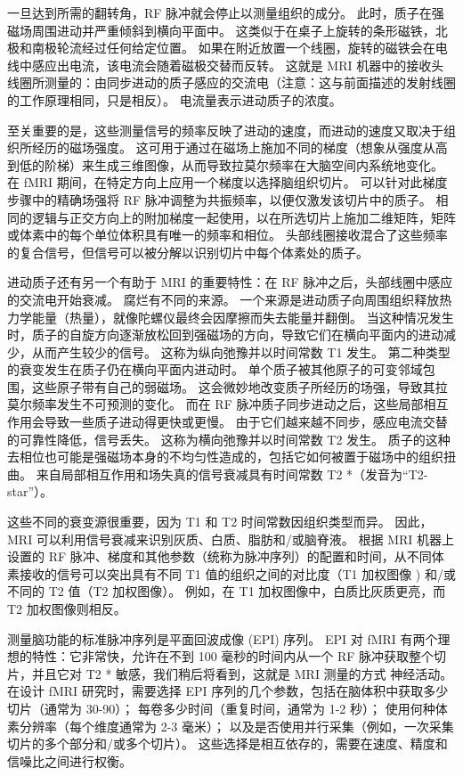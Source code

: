 一旦达到所需的翻转角，RF 脉冲就会停止以测量组织的成分。 
此时，质子在强磁场周围进动并严重倾斜到横向平面中。 
这类似于在桌子上旋转的条形磁铁，北极和南极轮流经过任何给定位置。 
如果在附近放置一个线圈，旋转的磁铁会在电线中感应出电流，该电流会随着磁极交替而反转。 
这就是 MRI 机器中的接收头线圈所测量的：由同步进动的质子感应的交流电（注意：这与前面描述的发射线圈的工作原理相同，只是相反）。 
电流量表示进动质子的浓度。


至关重要的是，这些测量信号的频率反映了进动的速度，而进动的速度又取决于组织所经历的磁场强度。 
这可用于通过在磁场上施加不同的梯度（想象从强度从高到低的阶梯）来生成三维图像，从而导致拉莫尔频率在大脑空间内系统地变化。 
在 fMRI 期间，在特定方向上应用一个梯度以选择脑组织切片。 
可以针对此梯度步骤中的精确场强将 RF 脉冲调整为共振频率，以便仅激发该切片中的质子。 
相同的逻辑与正交方向上的附加梯度一起使用，以在所选切片上施加二维矩阵，矩阵或体素中的每个单位体积具有唯一的频率和相位。 
头部线圈接收混合了这些频率的复合信号，但信号可以被分解以识别切片中每个体素处的质子。


进动质子还有另一个有助于 MRI 的重要特性：在 RF 脉冲之后，头部线圈中感应的交流电开始衰减。 
腐烂有不同的来源。 
一个来源是进动质子向周围组织释放热力学能量（热量），就像陀螺仪最终会因摩擦而失去能量并翻倒。 
当这种情况发生时，质子的自旋方向逐渐放松回到强磁场的方向，导致它们在横向平面内的进动减少，从而产生较少的信号。 
这称为纵向弛豫并以时间常数 T1 发生。 
第二种类型的衰变发生在质子仍在横向平面内进动时。 
单个质子被其他原子的可变邻域包围，这些原子带有自己的弱磁场。 
这会微妙地改变质子所经历的场强，导致其拉莫尔频率发生不可预测的变化。 
而在 RF 脉冲质子同步进动之后，这些局部相互作用会导致一些质子进动得更快或更慢。 
由于它们越来越不同步，感应电流交替的可靠性降低，信号丢失。 
这称为横向弛豫并以时间常数 T2 发生。 
质子的这种去相位也可能是强磁场本身的不均匀性造成的，包括它如何被置于磁场中的组织扭曲。 
来自局部相互作用和场失真的信号衰减具有时间常数 T2 *（发音为“T2-star”）。


这些不同的衰变源很重要，因为 T1 和 T2 时间常数因组织类型而异。 
因此，MRI 可以利用信号衰减来识别灰质、白质、脂肪和/或脑脊液。 
根据 MRI 机器上设置的 RF 脉冲、梯度和其他参数（统称为脉冲序列）的配置和时间，从不同体素接收的信号可以突出具有不同 T1 值的组织之间的对比度（T1 加权图像 ) 和/或不同的 T2 值（T2 加权图像）。 
例如，在 T1 加权图像中，白质比灰质更亮，而 T2 加权图像则相反。


测量脑功能的标准脉冲序列是平面回波成像 (EPI) 序列。 
EPI 对 fMRI 有两个理想的特性：它非常快，允许在不到 100 毫秒的时间内从一个 RF 脉冲获取整个切片，并且它对 T2 * 敏感，我们稍后将看到，这就是 MRI 测量的方式 神经活动。 
在设计 fMRI 研究时，需要选择 EPI 序列的几个参数，包括在脑体积中获取多少切片（通常为 30-90）； 
每卷多少时间（重复时间，通常为 1-2 秒）； 使用何种体素分辨率（每个维度通常为 2-3 毫米）； 
以及是否使用并行采集（例如，一次采集切片的多个部分和/或多个切片）。 
这些选择是相互依存的，需要在速度、精度和信噪比之间进行权衡。


